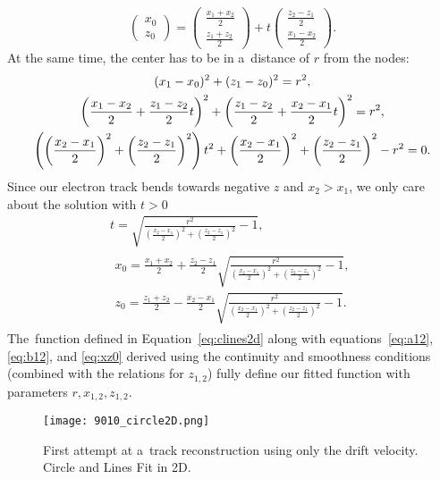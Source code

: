 				\begin{equation}
					\begin{pmatrix} x_0\\ z_0 \end{pmatrix} = \begin{pmatrix} \frac{x_1+x_2}{2}\\ \frac{z_1+z_2}{2} \end{pmatrix} + t \begin{pmatrix} \frac{z_2-z_1}{2}\\ \frac{x_1-x_2}{2} \end{pmatrix}.
				\end{equation}
			At the same time, the center has to be in a~distance of $r$ from the nodes:
				\begin{gather}
					(x_1-x_0)^2 + (z_1-z_0)^2 = r^2,\notag\\
					\left(\frac{x_1-x_2}{2}+\frac{z_1-z_2}{2}t\right)^2 + \left(\frac{z_1-z_2}{2}+\frac{x_2-x_1}{2}t\right)^2 = r^2,\notag\\
					\left(\left(\frac{x_2-x_1}{2}\right)^2+\left(\frac{z_2-z_1}{2}\right)^2\right)t^2+\left(\frac{x_2-x_1}{2}\right)^2+\left(\frac{z_2-z_1}{2}\right)^2-r^2=0.
				\end{gather}
			Since our electron track bends towards negative $z$ and $x_2 > x_1$, we only care about the solution with $t>0$
				\begin{gather}
					t = \sqrt{\frac{r^2}{\left(\frac{x_2-x_1}{2}\right)^2+\left(\frac{z_2-z_1}{2}\right)^2}-1},\\
					\begin{aligned}
						x_0 = \frac{x_1+x_2}{2} + \frac{z_2-z_1}{2} \sqrt{\frac{r^2}{\left(\frac{x_2-x_1}{2}\right)^2+\left(\frac{z_2-z_1}{2}\right)^2}-1},\label{eq:xz0}\\
						z_0 = \frac{z_1+z_2}{2} - \frac{x_2-x_1}{2} \sqrt{\frac{r^2}{\left(\frac{x_2-x_1}{2}\right)^2+\left(\frac{z_2-z_1}{2}\right)^2}-1}.
					\end{aligned}
				\end{gather}
			The~function defined in Equation~\ref{eq:clines2d} along with equations~\ref{eq:a12}, \ref{eq:b12}, and \ref{eq:xz0} derived using the continuity and smoothness conditions (combined with the relations for $z_{1,2}$) fully define our fitted function with parameters $r,x_{1,2},z_{1,2}$.
			
			\begin{figure}
				\centering
				\texttt{[image: 9010\_circle2D.png]}
				\caption{First attempt at a~track reconstruction using only the drift velocity. Circle and Lines Fit in 2D.}
				\label{fig:9010circle2D}
			\end{figure}
		

